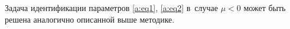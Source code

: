 


















Задача идентификации параметров \eqref{a:eq1}, \eqref{a:eq2} в~случае $\mu<0$ может быть решена аналогично описанной выше методике. 

